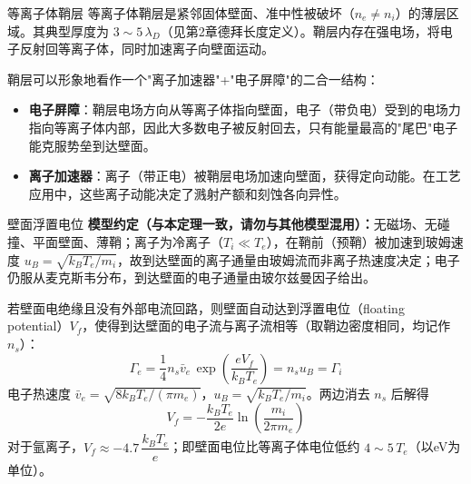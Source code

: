 \documentclass[12pt,a4paper,openany,oneside]{book}
\begin{document}
\begin{definition}{等离子体鞘层}{}{}
\label{def:sheath}
等离子体鞘层是紧邻固体壁面、准中性被破坏（$n_e \neq n_i$）的薄层区域。其典型厚度为 $3\sim 5\,\lambda_D$（见第2章德拜长度定义）。鞘层内存在强电场，将电子反射回等离子体，同时加速离子向壁面运动。
\end{definition}

\begin{insight}{}{}
鞘层可以形象地看作一个"离子加速器"+"电子屏障"的二合一结构：
\begin{itemize}
\item \textbf{电子屏障}：鞘层电场方向从等离子体指向壁面，电子（带负电）受到的电场力指向等离子体内部，因此大多数电子被反射回去，只有能量最高的"尾巴"电子能克服势垒到达壁面。
\item \textbf{离子加速器}：离子（带正电）被鞘层电场加速向壁面，获得定向动能。在工艺应用中，这些离子动能决定了溅射产额和刻蚀各向异性。
\end{itemize}
\end{insight}

\begin{theorem}{壁面浮置电位}{}{}
\label{thm:floating-potential}
\textbf{模型约定（与本定理一致，请勿与其他模型混用）：}无磁场、无碰撞、平面壁面、薄鞘；离子为冷离子（$T_i \ll T_e$），在鞘前（预鞘）被加速到玻姆速度 $u_B = \sqrt{k_BT_e/m_i}$，故到达壁面的离子通量由玻姆流而非离子热速度决定；电子仍服从麦克斯韦分布，到达壁面的电子通量由玻尔兹曼因子给出。

若壁面电绝缘且没有外部电流回路，则壁面自动达到浮置电位（floating potential）$V_f$，使得到达壁面的电子流与离子流相等（取鞘边密度相同，均记作 $n_s$）：
\begin{equation}
\label{eq:floating-potential}
\Gamma_e = \frac{1}{4} n_s \bar{v}_e \,\exp\!\left(\frac{eV_f}{k_B T_e}\right)
= n_s u_B = \Gamma_i
\end{equation}
电子热速度 $\bar{v}_e = \sqrt{8k_BT_e/(\pi m_e)}$，$u_B=\sqrt{k_BT_e/m_i}$。两边消去 $n_s$ 后解得
\begin{equation}
V_f = -\frac{k_B T_e}{2e} \ln\!\left(\frac{m_i}{2\pi m_e}\right)
\end{equation}
对于氩离子，$V_f \approx -4.7\,\dfrac{k_B T_e}{e}$；即壁面电位比等离子体电位低约 $4\sim 5\,T_e$（以eV为单位）。
\end{theorem}
\end{document}
